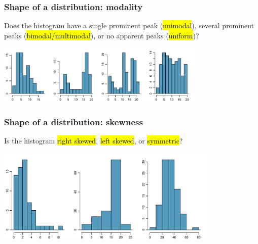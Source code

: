 \begin{frame}
\frametitle{Shape of a distribution: modality}

Does the histogram have a single prominent peak (\hl{unimodal}), several prominent peaks (\hl{bimodal/multimodal}), or no apparent peaks (\hl{uniform})?

\begin{center}
\includegraphics[width=0.75\textwidth]{2-1_numerical_data/figures/singleBiMultiModalUnifPlots/singleBiMultiModalUnifPlots}
\end{center}


\end{frame}


\begin{frame}
\frametitle{Shape of a distribution: skewness}

Is the histogram \hl{right skewed}, \hl{left skewed}, or \hl{symmetric}?

\begin{center}
\includegraphics[width=0.8\textwidth]{2-1_numerical_data/figures/skewedSymPlots/skewedSymPlots}
\end{center}


\end{frame}


